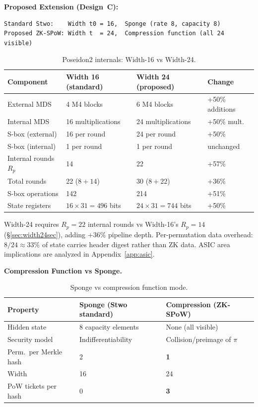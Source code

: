 \documentclass[11pt,a4paper]{article}
\begin{document}
\textbf{Proposed Extension (Design~C):}

\begin{Verbatim}[fontsize=\small]
Standard Stwo:    Width t0 = 16,  Sponge (rate 8, capacity 8)
Proposed ZK-SPoW: Width t  = 24,  Compression function (all 24 visible)
\end{Verbatim}

\begin{table}[h]
\centering
\small
\begin{tabular}{@{}llll@{}}
\toprule
Component & Width 16 (standard) & Width 24 (proposed) & Change \\
\midrule
External MDS & 4 M4 blocks & 6 M4 blocks & +50\% additions \\
Internal MDS & 16 multiplications & 24 multiplications & +50\% mult. \\
S-box (external) & 16 per round & 24 per round & +50\% \\
S-box (internal) & 1 per round & 1 per round & unchanged \\
Internal rounds $R_p$ & 14 & 22 & +57\% \\
Total rounds & 22 ($8{+}14$) & 30 ($8{+}22$) & +36\% \\
S-box operations & 142 & 214 & +51\% \\
State registers & $16 \times 31 = 496$ bits & $24 \times 31 = 744$ bits & +50\% \\
\bottomrule
\end{tabular}
\caption{Poseidon2 internals: Width-16 vs Width-24.}
\label{tab:internals}
\end{table}

Width-24 requires $R_p = 22$ internal rounds vs Width-16's $R_p = 14$ (\S\ref{sec:width24sec}), adding $+36\%$ pipeline depth. Per-permutation data overhead: $8/24 \approx 33\%$ of state carries header digest rather than ZK data. ASIC area implications are analyzed in Appendix~\ref{app:asic}.

\textbf{Compression Function vs Sponge.}

\begin{table}[h]
\centering
\begin{tabular}{@{}lll@{}}
\toprule
Property & Sponge (Stwo standard) & Compression (ZK-SPoW) \\
\midrule
Hidden state & 8 capacity elements & None (all visible) \\
Security model & Indifferentiability & Collision/preimage of $\pi$ \\
Perm.\ per Merkle hash & 2 & \textbf{1} \\
Width & 16 & 24 \\
PoW tickets per hash & 0 & \textbf{3} \\
\bottomrule
\end{tabular}
\caption{Sponge vs compression function mode.}
\label{tab:sponge-vs-comp}
\end{table}
\end{document}
